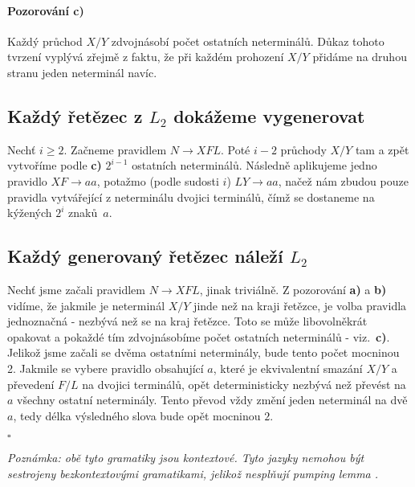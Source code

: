 \documentclass{scrartcl}
\begin{document}
    \paragraph{Pozorování c)} Každý průchod $X/Y$ zdvojnásobí počet ostatních neterminálů. Důkaz tohoto tvrzení vyplývá zřejmě z faktu, že při každém prohození $X/Y$ přidáme na druhou stranu jeden neterminál navíc.

    \subsection{Každý řetězec z $L_2$ dokážeme vygenerovat}
    Nechť $i \geq 2$. Začneme pravidlem $N \rightarrow XFL$. Poté $i-2$ průchody $X/Y$ tam a zpět vytvoříme podle \textbf{c)} $2^{i-1}$ ostatních neterminálů. Následně aplikujeme jedno pravidlo $XF \rightarrow aa$, potažmo (podle sudosti $i$) $LY \rightarrow aa$, načež nám zbudou pouze pravidla vytvářející z neterminálu dvojici terminálů, čímž se dostaneme na kýžených $2^i$ znaků~$a$.

    \subsection{Každý generovaný řetězec náleží $L_2$}
    Nechť jsme začali pravidlem $N \rightarrow XFL$, jinak triviálně. Z pozorování \textbf{a)} a \textbf{b)} vidíme, že jakmile je neterminál $X/Y$ jinde než na kraji řetězce, je volba pravidla jednoznačná - nezbývá než se  na kraj řetězce. Toto se může libovolněkrát opakovat a pokaždé tím zdvojnásobíme počet ostatních neterminálů - viz.~\textbf{c)}. Jelikož jsme začali se dvěma ostatními neterminály, bude tento počet mocninou 2. Jakmile se vybere pravidlo obsahující $a$, které je ekvivalentní smazání $X/Y$ a převedení $F/L$ na dvojici terminálů, opět deterministicky nezbývá než převést na $a$ všechny ostatní neterminály. Tento převod vždy změní jeden neterminál na dvě $a$, tedy délka výsledného slova bude opět mocninou $2$.\\
    \begin{flushright}
        $\square$
    \end{flushright} 

    \textit{Poznámka: obě tyto gramatiky jsou kontextové. Tyto jazyky nemohou být sestrojeny bezkontextovými gramatikami, jelikož nesplňují pumping lemma .}
\end{document}
